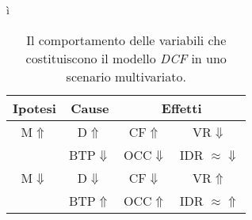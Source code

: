 ì\begin{table}[htbp]
\begin{center}
\begin{tabular}[c]{|c||*{3}{c|}}
\hline
Ipotesi &  Cause & \multicolumn{2}{|c|}{Effetti} \\
\hline \hline
M$\Uparrow$ & D$\Uparrow$ & CF$\Uparrow$ & VR$\Downarrow$  \\ 
\cline{2-4}
 & BTP$\Downarrow$ & OCC$\Downarrow$ & IDR $ \approx \Downarrow $  \\ \hline
\hline
M$\Downarrow$ &  D$\Downarrow$ & CF$\Downarrow$ & VR$\Uparrow$  \\ 
\cline{2-4}
 & BTP$\Uparrow$ & OCC$\Uparrow$ & IDR $ \approx \Uparrow $  \\ \hline

\end{tabular}
\caption[Comportamento variabili modello \textit{DCF} in scenari multivariati]{Il comportamento delle variabili che costituiscono il modello \textit{DCF} in uno scenario multivariato.}
\label{tab:mulvariazioni}
\end{center}
\end{table}
